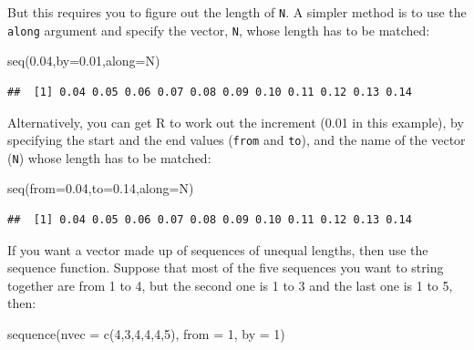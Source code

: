 \documentclass[
]{book}
\newenvironment{Shaded}{\begin{snugshade}}{\end{snugshade}}
\newcommand{\AttributeTok}[1]{\textcolor[rgb]{0.77,0.63,0.00}{#1}}
\newcommand{\DecValTok}[1]{\textcolor[rgb]{0.00,0.00,0.81}{#1}}
\newcommand{\FloatTok}[1]{\textcolor[rgb]{0.00,0.00,0.81}{#1}}
\newcommand{\FunctionTok}[1]{\textcolor[rgb]{0.00,0.00,0.00}{#1}}
\newcommand{\NormalTok}[1]{#1}
\theoremstyle{definition}
\theoremstyle{definition}
\theoremstyle{definition}
\theoremstyle{definition}
\theoremstyle{remark}
\begin{document}
But this requires you to figure out the length of \texttt{N}. A simpler method is to use the \texttt{along} argument and specify the vector, \texttt{N}, whose length has to be matched:

\begin{Shaded}
\begin{Highlighting}[]
\FunctionTok{seq}\NormalTok{(}\FloatTok{0.04}\NormalTok{,}\AttributeTok{by=}\FloatTok{0.01}\NormalTok{,}\AttributeTok{along=}\NormalTok{N)}
\end{Highlighting}
\end{Shaded}

\begin{verbatim}
##  [1] 0.04 0.05 0.06 0.07 0.08 0.09 0.10 0.11 0.12 0.13 0.14
\end{verbatim}

Alternatively, you can get R to work out the increment (0.01 in this example), by specifying the start and the end values (\texttt{from} and \texttt{to}), and the name of the vector (\texttt{N}) whose length has to be matched:

\begin{Shaded}
\begin{Highlighting}[]
\FunctionTok{seq}\NormalTok{(}\AttributeTok{from=}\FloatTok{0.04}\NormalTok{,}\AttributeTok{to=}\FloatTok{0.14}\NormalTok{,}\AttributeTok{along=}\NormalTok{N)}
\end{Highlighting}
\end{Shaded}

\begin{verbatim}
##  [1] 0.04 0.05 0.06 0.07 0.08 0.09 0.10 0.11 0.12 0.13 0.14
\end{verbatim}

If you want a vector made up of sequences of unequal lengths, then use the sequence function. Suppose that most of the five sequences you want to string together are from 1 to 4, but the second one is 1 to 3 and the last one is 1 to 5, then:

\begin{Shaded}
\begin{Highlighting}[]
\FunctionTok{sequence}\NormalTok{(}\AttributeTok{nvec =} \FunctionTok{c}\NormalTok{(}\DecValTok{4}\NormalTok{,}\DecValTok{3}\NormalTok{,}\DecValTok{4}\NormalTok{,}\DecValTok{4}\NormalTok{,}\DecValTok{4}\NormalTok{,}\DecValTok{5}\NormalTok{), }\AttributeTok{from =} \DecValTok{1}\NormalTok{, }\AttributeTok{by =} \DecValTok{1}\NormalTok{)}
\end{Highlighting}
\end{Shaded}
\end{document}
